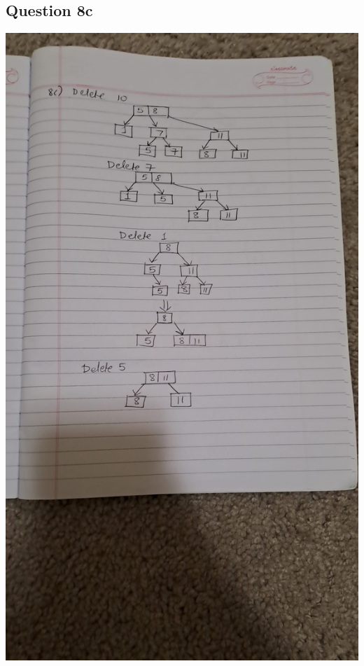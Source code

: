 \documentclass{article}
\begin{document}
  \subsection*{Question 8c}
  \includegraphics[scale=0.2]{8c.jpeg}
\end{document}
